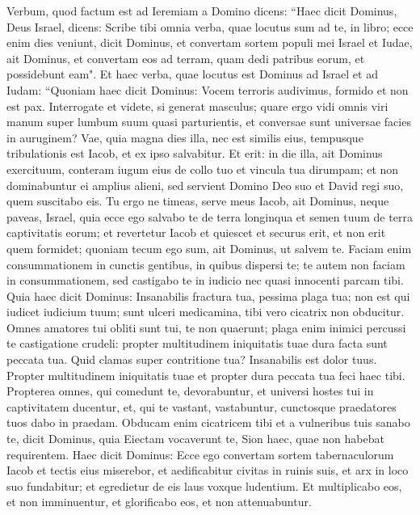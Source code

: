 \begin{biblechapter}  
\verse Verbum, quod factum est ad Ieremiam a Domino dicens: 
\verse “Haec dicit Dominus, Deus Israel, dicens: Scribe tibi omnia verba, quae locutus sum ad te, in libro; 
\verse ecce enim dies veniunt, dicit Dominus, et convertam sortem populi mei Israel et Iudae, ait Dominus, et convertam eos ad terram, quam dedi patribus eorum, et possidebunt eam". 
\verse Et haec verba, quae locutus est Dominus ad Israel et ad Iudam: 
\verse “Quoniam haec dicit Dominus: Vocem terroris audivimus, formido et non est pax. 
\verse Interrogate et videte, si generat masculus; quare ergo vidi omnis viri manum super lumbum suum quasi parturientis, et conversae sunt universae facies in auruginem? 
\verse Vae, quia magna dies illa, nec est similis eius, tempusque tribulationis est Iacob, et ex ipso salvabitur. 
\verse Et erit: in die illa, ait Dominus exercituum, conteram iugum eius de collo tuo et vincula tua dirumpam; et non dominabuntur ei amplius alieni, 
\verse sed servient Domino Deo suo et David regi suo, quem suscitabo eis. 
\verse Tu ergo ne timeas, serve meus Iacob, ait Dominus, neque paveas, Israel, quia ecce ego salvabo te de terra longinqua et semen tuum de terra captivitatis eorum; et revertetur Iacob et quiescet et securus erit, et non erit quem formidet; 
\verse quoniam tecum ego sum, ait Dominus, ut salvem te. Faciam enim consummationem in cunctis gentibus, in quibus dispersi te; te autem non faciam in consummationem, sed castigabo te in iudicio nec quasi innocenti parcam tibi. 
\verse Quia haec dicit Dominus: Insanabilis fractura tua, pessima plaga tua; 
\verse non est qui iudicet iudicium tuum; sunt ulceri medicamina, tibi vero cicatrix non obducitur. 
\verse Omnes amatores tui obliti sunt tui, te non quaerunt; plaga enim inimici percussi te castigatione crudeli: propter multitudinem iniquitatis tuae dura facta sunt peccata tua. 
\verse Quid clamas super contritione tua? Insanabilis est dolor tuus. Propter multitudinem iniquitatis tuae et propter dura peccata tua feci haec tibi. 
\verse Propterea omnes, qui comedunt te, devorabuntur, et universi hostes tui in captivitatem ducentur, et, qui te vastant, vastabuntur, cunctosque praedatores tuos dabo in praedam. 
\verse Obducam enim cicatricem tibi et a vulneribus tuis sanabo te, dicit Dominus, quia Eiectam vocaverunt te, Sion haec, quae non habebat requirentem. 
\verse Haec dicit Dominus: Ecce ego convertam sortem tabernaculorum Iacob et tectis eius miserebor, et aedificabitur civitas in ruinis suis, et arx in loco suo fundabitur; 
\verse et egredietur de eis laus voxque ludentium. Et multiplicabo eos, et non imminuentur, et glorificabo eos, et non attenuabuntur. 

\end{biblechapter}
